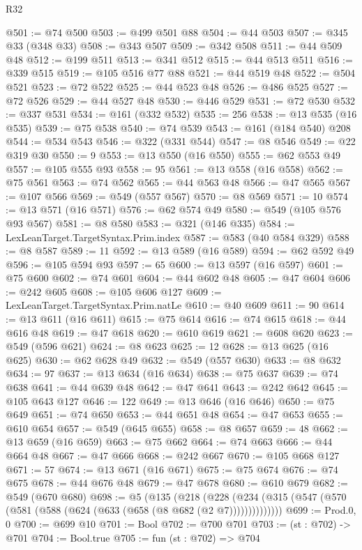 \begin{lexlean}{R32}
\begin{coremodule}
@501 := @74 @500
@503 := @499 @501 @88
@504 := @44 @503
@507 := @345 @33 (@348 @33)
@508 := @343 @507
@509 := @342 @508
@511 := @44 @509 @48
@512 := @199 @511
@513 := @341 @512
@515 := @44 @513 @511
@516 := @339 @515
@519 := @105 @516 @77 @88
@521 := @44 @519 @48
@522 := @504 @521
@523 := @72 @522
@525 := @44 @523 @48
@526 := @486 @525
@527 := @72 @526
@529 := @44 @527 @48
@530 := @446 @529
@531 := @72 @530
@532 := @337 @531
@534 := @161 (@332 @532)
@535 := 256
@538 := @13 @535 (@16 @535)
@539 := @75 @538
@540 := @74 @539
@543 := @161 (@184 @540) @208
@544 := @534 @543
@546 := @322 (@331 @544)
@547 := @8 @546
@549 := @22 @319 @30
@550 := 9
@553 := @13 @550 (@16 @550)
@555 := @62 @553 @49
@557 := @105 @555 @93
@558 := 95
@561 := @13 @558 (@16 @558)
@562 := @75 @561
@563 := @74 @562
@565 := @44 @563 @48
@566 := @47 @565
@567 := @107 @566
@569 := @549 (@557 @567)
@570 := @8 @569
@571 := 10
@574 := @13 @571 (@16 @571)
@576 := @62 @574 @49
@580 := @549 (@105 @576 @93 @567)
@581 := @8 @580
@583 := @321 (@146 @335)
@584 := LexLeanTarget.TargetSyntax.Prim.index
@587 := @583 (@40 @584 @329)
@588 := @8 @587
@589 := 11
@592 := @13 @589 (@16 @589)
@594 := @62 @592 @49
@596 := @105 @594 @93
@597 := 65
@600 := @13 @597 (@16 @597)
@601 := @75 @600
@602 := @74 @601
@604 := @44 @602 @48
@605 := @47 @604
@606 := @242 @605
@608 := @105 @606 @127
@609 := LexLeanTarget.TargetSyntax.Prim.natLe
@610 := @40 @609
@611 := 90
@614 := @13 @611 (@16 @611)
@615 := @75 @614
@616 := @74 @615
@618 := @44 @616 @48
@619 := @47 @618
@620 := @610 @619
@621 := @608 @620
@623 := @549 (@596 @621)
@624 := @8 @623
@625 := 12
@628 := @13 @625 (@16 @625)
@630 := @62 @628 @49
@632 := @549 (@557 @630)
@633 := @8 @632
@634 := 97
@637 := @13 @634 (@16 @634)
@638 := @75 @637
@639 := @74 @638
@641 := @44 @639 @48
@642 := @47 @641
@643 := @242 @642
@645 := @105 @643 @127
@646 := 122
@649 := @13 @646 (@16 @646)
@650 := @75 @649
@651 := @74 @650
@653 := @44 @651 @48
@654 := @47 @653
@655 := @610 @654
@657 := @549 (@645 @655)
@658 := @8 @657
@659 := 48
@662 := @13 @659 (@16 @659)
@663 := @75 @662
@664 := @74 @663
@666 := @44 @664 @48
@667 := @47 @666
@668 := @242 @667
@670 := @105 @668 @127
@671 := 57
@674 := @13 @671 (@16 @671)
@675 := @75 @674
@676 := @74 @675
@678 := @44 @676 @48
@679 := @47 @678
@680 := @610 @679
@682 := @549 (@670 @680)
@698 := @5
    (@135
      (@218
        (@228 (@234 (@315 (@547 (@570 (@581 (@588 (@624 (@633 (@658 (@8 @682 (@2 @7))))))))))))))
@699 := Prod.{0, 0}
@700 := @699 @10
@701 := Bool
@702 := @700 @701
@703 := (st : @702) -> @701
@704 := Bool.true
@705 := fun (st : @702) => @704

\end{coremodule}
\end{lexlean}

